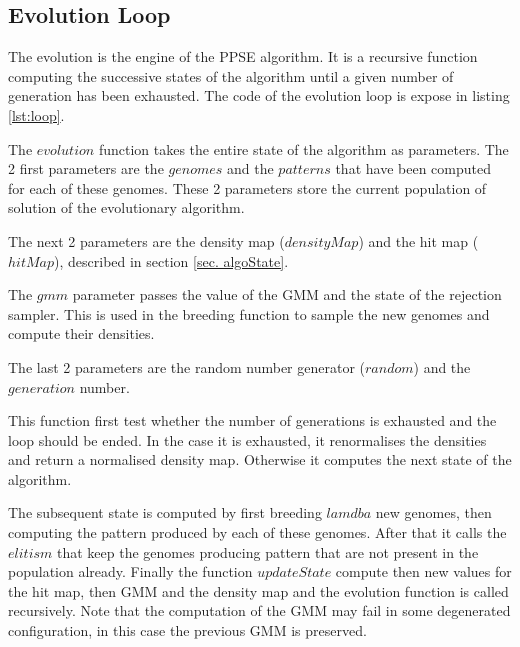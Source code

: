 \documentclass[10pt,a4paper]{article}
\theoremstyle{definition}
\theoremstyle{remark}
\begin{document}
\subsection{Evolution Loop}

The evolution is the engine of the PPSE algorithm. It is a recursive function computing the successive states of the algorithm until a given number of generation has been exhausted. The code of the evolution loop is expose in listing \ref{lst:loop}.

The $evolution$ function takes the entire state of the algorithm as parameters. The 2 first parameters are the $genomes$ and the $patterns$ that have been computed for each of these genomes. These 2 parameters store the current population of solution of the evolutionary algorithm.

The next 2 parameters are the density map ($densityMap$) and the hit map ($hitMap$), described in section \ref{sec. algoState}.

The $gmm$ parameter passes the value of the GMM and the state of the rejection sampler. This is used in the breeding function to sample the new genomes and compute their densities.

The last 2 parameters are the random number generator ($random$) and the $generation$ number.

This function first test whether the number of generations is exhausted and the loop should be ended. In the case it is exhausted, it renormalises the densities and return a normalised density map. Otherwise it computes the next state of the algorithm.

The subsequent state is computed by first breeding $lamdba$ new genomes, then computing the pattern produced by each of these genomes. After that it calls the $elitism$ that keep the genomes producing pattern that are not present in the population already. Finally the function $updateState$ compute then new values for the hit map, then GMM and the density map and the evolution function is called recursively. Note that the computation of the GMM may fail in some degenerated configuration, in this case the previous GMM is preserved.
\end{document}
